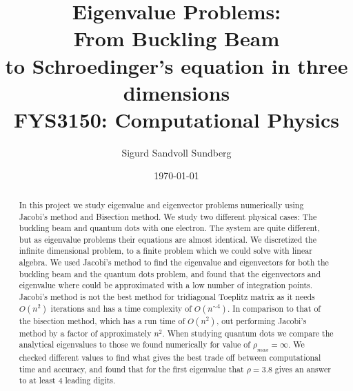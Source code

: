 \documentclass[%
reprint,
nofootinbib,
amsmath,amssymb,
aps,
]{revtex4-1}
\begin{document}
	
\title{Eigenvalue Problems: \\
	\normalsize{From Buckling Beam\\
		to Schroedinger's equation in three dimensions} \\
	\hrulefill\small{ FYS3150: Computational Physics }\hrulefill}

\author{Sigurd Sandvoll Sundberg}

%

\date{\today}

\begin{abstract}%
In this project we study eigenvalue and eigenvector problems numerically using Jacobi's method and Bisection method\cite{barth1967calculation}. We study two different physical cases: The buckling beam and quantum dots with one electron. The system are quite different, but as eigenvalue problems their equations are almost identical. We discretized the infinite dimensional problem, to a finite problem which we could solve with linear algebra. We used Jacobi's method to find the eigenvalue and eigenvectors for both the buckling beam and the quantum dots problem, and found that the eigenvectors and eigenvalue where could be approximated with a low number of integration points. Jacobi's method is not the best method for tridiagonal Toeplitz matrix as it needs $O(n^2)$ iterations and has a time complexity of $O(n^{\sim 4})$. In comparison to that of the bisection method, which has a run time of $O(n^2)$, out performing Jacobi's method by a factor of approximately $n^2$. When studying quantum dots we compare the analytical eigenvalues to those we found numerically for value of $\rho_{max} = \infty$. We checked different values to find what gives the best trade off between computational time and accuracy, and found that for the first eigenvalue that $\rho = 3.8$ gives an answer to at least 4 leading digits. 
\end{abstract}

\maketitle 
\end{document}
